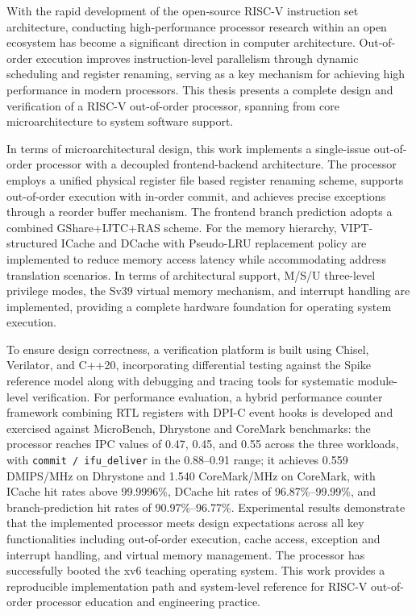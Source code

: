 \begin{eabstract}

With the rapid development of the open-source RISC-V instruction set architecture, conducting high-performance processor research within an open ecosystem has become a significant direction in computer architecture. Out-of-order execution improves instruction-level parallelism through dynamic scheduling and register renaming, serving as a key mechanism for achieving high performance in modern processors. This thesis presents a complete design and verification of a RISC-V out-of-order processor, spanning from core microarchitecture to system software support.

In terms of microarchitectural design, this work implements a single-issue out-of-order processor with a decoupled frontend-backend architecture. The processor employs a unified physical register file based register renaming scheme, supports out-of-order execution with in-order commit, and achieves precise exceptions through a reorder buffer mechanism. The frontend branch prediction adopts a combined GShare+IJTC+RAS scheme. For the memory hierarchy, VIPT-structured ICache and DCache with Pseudo-LRU replacement policy are implemented to reduce memory access latency while accommodating address translation scenarios. In terms of architectural support, M/S/U three-level privilege modes, the Sv39 virtual memory mechanism, and interrupt handling are implemented, providing a complete hardware foundation for operating system execution.

To ensure design correctness, a verification platform is built using Chisel, Verilator, and C++20, incorporating differential testing against the Spike reference model along with debugging and tracing tools for systematic module-level verification. For performance evaluation, a hybrid performance counter framework combining RTL registers with DPI-C event hooks is developed and exercised against MicroBench, Dhrystone and CoreMark benchmarks: the processor reaches IPC values of 0.47, 0.45, and 0.55 across the three workloads, with \lstinline|commit / ifu_deliver| in the 0.88--0.91 range; it achieves 0.559 DMIPS/MHz on Dhrystone and 1.540 CoreMark/MHz on CoreMark, with ICache hit rates above 99.9996\%, DCache hit rates of 96.87\%--99.99\%, and branch-prediction hit rates of 90.97\%--96.77\%. Experimental results demonstrate that the implemented processor meets design expectations across all key functionalities including out-of-order execution, cache access, exception and interrupt handling, and virtual memory management. The processor has successfully booted the xv6 teaching operating system. This work provides a reproducible implementation path and system-level reference for RISC-V out-of-order processor education and engineering practice.

\end{eabstract}

